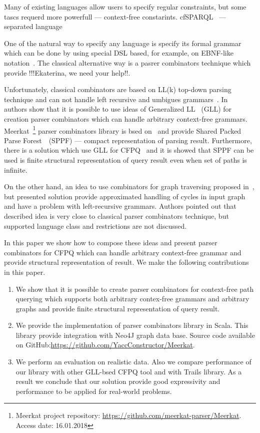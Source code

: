 Many of existing languages allow users to specify regular constraints, but some tascs requerd more powerfull --- context-free constarints.
cfSPARQL~\cite{CFGonRDF} --- separated language


One of the natural way to specify any language is specify its formal grammar which can be done by using special DSL based, for example, on EBNF-like notation~\cite{EBNFISO}.
The classical alternative way is a pasrer combinators technique which provide !!!Ekaterina, we need your help!!.

Unfortunately, classical combinators are based on LL(k) top-down parsing technique and can not handle left recursive and umbigues grammars~\cite{!!!}.
In~\cite{Meerkat} authors show that it is possible to use ideas of Generalized LL~\cite{scott2010gll} (GLL) for creation parser combinators which can handle arbitrary context-free grammars.
Meerkat~\footnote{Meerkat project repository: \url{https://github.com/meerkat-parser/Meerkat}. Access date: 16.01.2018} parser combinators library is bsed on~\cite{Meerkat} and provide Shared Packed Parse Forest~\cite{SPPF}~(SPPF) --- compact representation of parsing result. 
Furthermore, there is a solution which use GLL for CFPQ~\cite{GrigorevR16} and it is showed that SPPF can be used is finite structural representation of query result even when set of paths is infinite.

On the other hand, an idea to use combinators for graph traversing proposed in~\cite{ScalaGraphParsing}, but presented solution provide approximated handling of cycles in input graph and have a problem with left-recursive grammars. 
Authors pointed out that described idea is very close to classical parser combinators technique, but supported language class and restrictions are not discussed.

In this paper we show how to compose these ideas and present parser combinators for CFPQ which can handle arbitrary context-free grammar and provide structural representation of result.
We make the following contributions in this paper.

\begin{enumerate}
\item We show that it is possible to create parser combinators for context-free path querying which supports both arbitrary contex-free grammars and arbitrary graphs and provide finite structural representation of query result.
\item We provide the implementation of parser combinators library in Scala. This library provide integration with Neo4J graph data base. Source code available on GitHub:\url{https://github.com/YaccConstructor/Meerkat}.
\item We perform an evaluation on realistic data. 
Also we compare performance of our library with other GLL-bsed CFPQ tool and with Trails library.
As a result we conclude that our solution provide good expressivity and performance to be applied for real-world problems. 
\end{enumerate}
